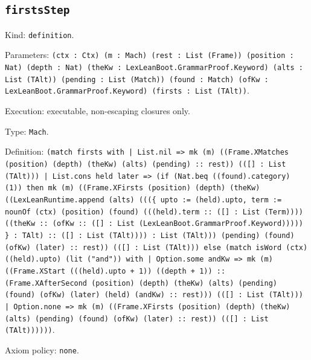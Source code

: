 \documentclass[11pt]{article}
\begin{document}
\subsection*{\texttt{firstsStep}}
\noindent Kind: \texttt{definition}.\par
\noindent Parameters: \texttt{(ctx : Ctx) (m : Mach) (rest : List (Frame)) (position : Nat) (depth : Nat) (theKw : LexLeanBoot.GrammarProof.Keyword) (alts : List (TAlt)) (pending : List (Match)) (found : Match) (ofKw : LexLeanBoot.GrammarProof.Keyword) (firsts : List (TAlt))}.\par
\noindent Execution: executable, non-escaping closures only.\par
\noindent Type: \texttt{Mach}.\par
\noindent Definition: \texttt{(match firsts with | List.nil => mk (m) ((Frame.XMatches (position) (depth) (theKw) (alts) (pending) :: rest)) (([] : List (TAlt))) | List.cons held later => (if (Nat.beq ((found).category) (1)) then mk (m) ((Frame.XFirsts (position) (depth) (theKw) ((LexLeanRuntime.append (alts) (((\{ upto := (held).upto, term := nounOf (ctx) (position) (found) (((held).term :: ([] : List (Term)))) ((theKw :: (ofKw :: ([] : List (LexLeanBoot.GrammarProof.Keyword))))) \} : TAlt) :: ([] : List (TAlt)))) : List (TAlt))) (pending) (found) (ofKw) (later) :: rest)) (([] : List (TAlt))) else (match isWord (ctx) ((held).upto) (lit ("and")) with | Option.some andKw => mk (m) ((Frame.XStart (((held).upto + 1)) ((depth + 1)) :: (Frame.XAfterSecond (position) (depth) (theKw) (alts) (pending) (found) (ofKw) (later) (held) (andKw) :: rest))) (([] : List (TAlt))) | Option.none => mk (m) ((Frame.XFirsts (position) (depth) (theKw) (alts) (pending) (found) (ofKw) (later) :: rest)) (([] : List (TAlt))))))}.\par
\noindent Axiom policy: \texttt{none}.\par
\end{document}
